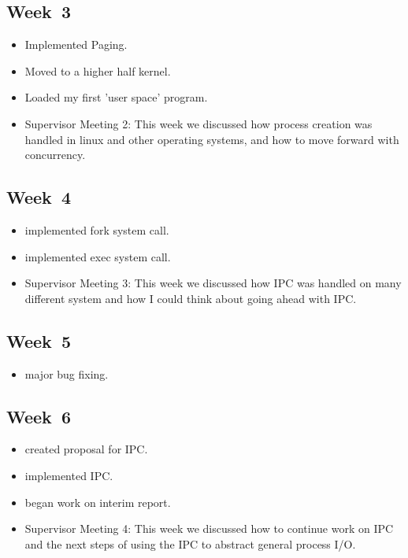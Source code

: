 \documentclass[a4paper]{report}
\begin{document}
\subsection*{Week 3}
\begin{itemize}
\item Implemented Paging.
\item Moved to a higher half kernel.
\item Loaded my first 'user space' program.
\item Supervisor Meeting 2: This week we discussed how process creation was handled in linux and other operating systems, and how to move forward with concurrency.
\end{itemize}

\subsection*{Week 4}
\begin{itemize}
\item implemented fork system call.
\item implemented exec system call.
\item Supervisor Meeting 3: This week we discussed how IPC was handled on many different system and how I could think about going ahead with IPC.
\end{itemize}

\subsection*{Week 5}
\begin{itemize}
\item major bug fixing.
\end{itemize}

\subsection*{Week 6}
\begin{itemize}
\item created proposal for IPC.
\item implemented IPC.
\item began work on interim report.
\item Supervisor Meeting 4: This week we discussed how to continue work on IPC and the next steps of using the IPC to abstract general process I/O.
\end{itemize}
\end{document}

